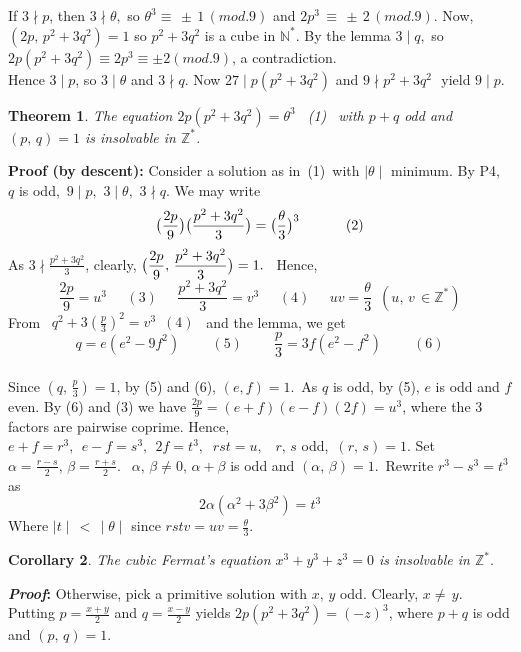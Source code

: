 \documentclass[11pt,a4paper]{article}
\newtheorem{thm}{Theorem}
\newtheorem{cor}[thm]{Corollary}
\begin{document}
\begin{enumerate}
\begin{enumerate}[(P4)]
        If $3\nmid p$, then $3\nmid \theta, $ so $\theta^3 \equiv\,\pm\,1\,(mod.9)$ and $2p^3\,\equiv \,\pm\,2\,(mod.9)$. Now, $(2p,\,p^2+3q^2)=1$ so $p^2+3q^2$ is a cube in $\mathbb{N}^*$. By the lemma $3\mid q,$ so $2p(p^2+3q^2)\equiv 2p^3\equiv \pm2(mod.9)$, a contradiction.\\
        Hence $3\mid p$, so $3\mid \theta$ and $3\nmid q$. Now $27\mid p(p^2+3q^2)$ and $9\nmid p^2+3q^2$ \,\,yield $9\mid p$.\\
  \end{enumerate}
        \begin{thm}
          The equation $2p(p^2+3q^2)=\theta^3$\,\,\, (1)\,\,\, with $p+q$ odd and $(p,\,q)=1$ is insolvable in $\mathbb{Z}^*$.
        \end{thm}
        \textbf{Proof (by descent):} Consider a solution as in \,(1)\, with $\mid \theta \mid$ minimum. By P4,\, $q$ is odd,\, $9\mid p,\,\,3\mid \theta,\,\, 3\nmid q$. We may write $$\displaystyle \big{(}\frac{2p}{9}\big{)}\big{(}\frac{p^2+3q^2}{3}\big{)}=\big{(}\frac{\theta}{3}\big{)}^3\;\;\;\;\;\;\;\;\;\;\;\;(2)$$
        As $3\nmid \displaystyle \frac{p^2+3q^2}{3}$, clearly, $\displaystyle \big{(}\frac{2p}{9},\,\frac{p^2+3q^2}{3}\big{)}=1.$ \, Hence, $$\displaystyle  \frac{2p}{9}=u^3\;\;\;\;\;(3)\;\;\;\;\; \frac{p^2+3q^2}{3}=v^3\;\;\;\;\; (4)\;\;\;\;\; uv=\frac{\theta}{3}\,\,\, (u,\,v\,\in \mathbb{Z}^*)$$
        From \, $q^2+3\displaystyle (\frac{p}{3})^2=v^3\,\,\,(4)\,\,\,$ and the lemma, we get $$q=e(e^2-9f^2)\;\;\;\;\;\;\;\; (5)
         \;\;\;\;\;\;\;\;\displaystyle \frac{p}{3}=3f(e^2-f^2)\;\;\;\;\;\;\;\; (6)$$\\
         Since $(q,\,\frac{p}{3})=1$, by (5) and (6), $(e,f)=1.\,$ As $q$ is odd, by (5), $e$ is odd and $f$ even. By (6) and (3) we have $\displaystyle \frac{2p}{9}=(e+f)(e-f)(2f)=u^3$, where the $3$ factors are pairwise coprime. Hence, $e+f=r^3,\;\,e-f=s^3,\,\; 2f=t^3,\;\; rst=u,\;\;\; r,\,s$ odd,\, $(r,\,s)=1$.
         Set $\alpha=\displaystyle \frac{r-s}{2},\, \beta=\frac{r+s}{2}.\;\,\,\,\alpha,\,\beta\neq 0,\, \alpha+\beta$ is odd and $(\alpha,\,\beta)=1.$ \,Rewrite $r^3-s^3=t^3$ as $$2\alpha(\alpha^2+3\beta^2)=t^3$$
         Where $\mid t\mid \,<\, \mid \theta \mid$  since $rstv=uv=\displaystyle \frac{\theta}{3}$.\\
         \begin{cor}
             The cubic Fermat's equation $x^3+y^3+z^3=0$ is insolvable in $\mathbb{Z}^*.$
         \end{cor}
            \textbf{\textit{Proof}:} Otherwise, pick a primitive solution with $x,\,y$ odd. Clearly, $x\neq\,y.$  Putting $\displaystyle p=\frac{x+y}{2}$ and $\displaystyle q=\frac{x-y}{2}$ \;yields\; $2p(p^2+3q^2)=(-z)^3$,\; where $p+q$ is odd and $(p,\,q)=1$.

\end{enumerate}
\end{document}

